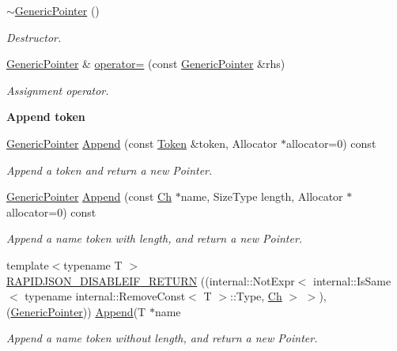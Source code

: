 \begin{Indent}
\begin{DoxyCompactItemize}
\mbox{\label{classGenericPointer_acf3eb2f7c4ebf9256f638aafa17534cb}} 
\hyperlink{classGenericPointer_acf3eb2f7c4ebf9256f638aafa17534cb}{$\sim$\+Generic\+Pointer} ()
\begin{DoxyCompactList}\small\item\em Destructor. \end{DoxyCompactList}\item 
\mbox{\label{classGenericPointer_a1d0174a6e72daa4024da9e08ce1e7951}} 
\hyperlink{classGenericPointer}{Generic\+Pointer} \& \hyperlink{classGenericPointer_a1d0174a6e72daa4024da9e08ce1e7951}{operator=} (const \hyperlink{classGenericPointer}{Generic\+Pointer} \&rhs)
\begin{DoxyCompactList}\small\item\em Assignment operator. \end{DoxyCompactList}\end{DoxyCompactItemize}
\end{Indent}
\begin{Indent}\textbf{ Append token}\par
\begin{DoxyCompactItemize}
\item 
\hyperlink{classGenericPointer}{Generic\+Pointer} \hyperlink{classGenericPointer_aa8f86c0f330807f337351a95ae254b78}{Append} (const \hyperlink{structGenericPointer_1_1Token}{Token} \&token, Allocator $\ast$allocator=0) const
\begin{DoxyCompactList}\small\item\em Append a token and return a new Pointer. \end{DoxyCompactList}\item 
\hyperlink{classGenericPointer}{Generic\+Pointer} \hyperlink{classGenericPointer_a9f8a1711f5b8e0d951c25c6c65326f77}{Append} (const \hyperlink{classGenericPointer_ab292356c11b4015c98d21b966b11f285}{Ch} $\ast$name, Size\+Type length, Allocator $\ast$allocator=0) const
\begin{DoxyCompactList}\small\item\em Append a name token with length, and return a new Pointer. \end{DoxyCompactList}\item 
{\footnotesize template$<$typename T $>$ }\\\hyperlink{classGenericPointer_aaf4d7d852098878d24188d134182d42f}{R\+A\+P\+I\+D\+J\+S\+O\+N\+\_\+\+D\+I\+S\+A\+B\+L\+E\+I\+F\+\_\+\+R\+E\+T\+U\+RN} ((internal\+::\+Not\+Expr$<$ internal\+::\+Is\+Same$<$ typename internal\+::\+Remove\+Const$<$ T $>$\+::Type, \hyperlink{classGenericPointer_ab292356c11b4015c98d21b966b11f285}{Ch} $>$ $>$),(\hyperlink{classGenericPointer}{Generic\+Pointer})) \hyperlink{classGenericPointer_aa8f86c0f330807f337351a95ae254b78}{Append}(T $\ast$name
\begin{DoxyCompactList}\small\item\em Append a name token without length, and return a new Pointer. \end{DoxyCompactList}\end{DoxyCompactItemize}
\end{Indent}
